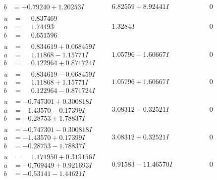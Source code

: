 \documentclass[1p]{elsarticle_modified}
\theoremstyle{definition}
\begin{document}
$$\begin{array}{c|c|c}
\begin{aligned}
b &= -0.79240 + 1.20253 I\end{aligned}
 & \phantom{-}6.82559 + 8.92441 I & \phantom{-0.000000 } 0 \\ \hline\begin{aligned}
u &= \phantom{-}0.837469\phantom{ +0.000000I} \\
a &= \phantom{-}1.74493\phantom{ +0.000000I} \\
b &= \phantom{-}0.651596\phantom{ +0.000000I}\end{aligned}
 & \phantom{-}1.32843\phantom{ +0.000000I} & \phantom{-0.000000 } 0 \\ \hline\begin{aligned}
u &= \phantom{-}0.834619 + 0.068459 I \\
a &= \phantom{-}1.11868 - 1.15771 I \\
b &= \phantom{-}0.122964 + 0.871724 I\end{aligned}
 & \phantom{-}1.05796 - 1.60667 I & \phantom{-0.000000 } 0 \\ \hline\begin{aligned}
u &= \phantom{-}0.834619 - 0.068459 I \\
a &= \phantom{-}1.11868 + 1.15771 I \\
b &= \phantom{-}0.122964 - 0.871724 I\end{aligned}
 & \phantom{-}1.05796 + 1.60667 I & \phantom{-0.000000 } 0 \\ \hline\begin{aligned}
u &= -0.747301 + 0.300818 I \\
a &= -1.43570 - 0.17399 I \\
b &= -0.28753 + 1.78837 I\end{aligned}
 & \phantom{-}3.08312 - 0.32521 I & \phantom{-0.000000 } 0 \\ \hline\begin{aligned}
u &= -0.747301 - 0.300818 I \\
a &= -1.43570 + 0.17399 I \\
b &= -0.28753 - 1.78837 I\end{aligned}
 & \phantom{-}3.08312 + 0.32521 I & \phantom{-0.000000 } 0 \\ \hline\begin{aligned}
u &= \phantom{-}1.171950 + 0.319156 I \\
a &= -0.769449 + 0.921693 I \\
b &= -0.53141 - 1.44621 I\end{aligned}
 & \phantom{-}0.91583 - 11.46570 I & \phantom{-0.000000 } 0\\

\end{array}$$
\end{document}
